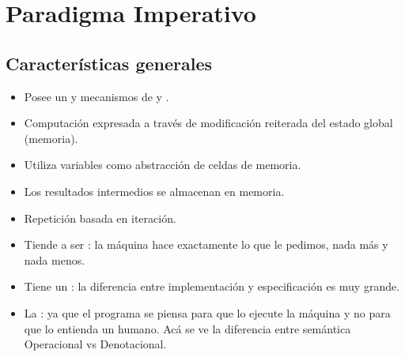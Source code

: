 \section{Paradigma Imperativo}

\subsection{Características generales}

\begin{itemize}
  \item Posee un  y mecanismos de  y .
  \item Computación expresada a través de modificación reiterada del estado global (memoria).
  \item Utiliza variables como abstracción de celdas de memoria.
  \item Los resultados intermedios se almacenan en memoria.
  \item Repetición basada en iteración.
  \item Tiende a ser : la máquina hace exactamente lo que le pedimos, nada más y nada menos.
  \item Tiene un : la diferencia entre implementación y especificación es muy grande.
  \item La : ya que el programa se piensa para que lo ejecute la máquina y no para que lo entienda un humano. Acá se ve la diferencia entre semántica Operacional vs Denotacional.
\end{itemize}
